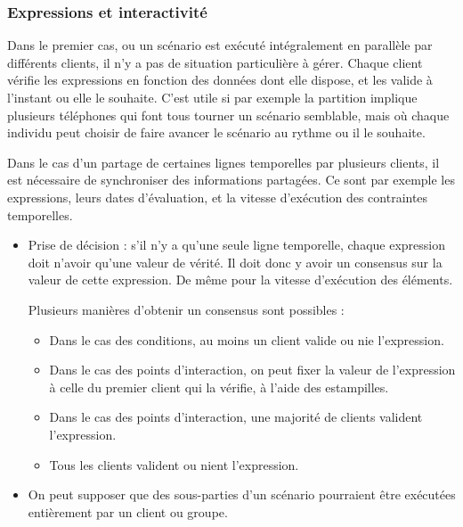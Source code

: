 \documentclass{article}
\begin{document}
\begin{figure}[h]
	\centering
	\begin{tikzpicture}
	
	\end{tikzpicture}
	\label{scenar.non-interactif}
\end{figure}


\subsubsection{Expressions et interactivité}
Dans le premier cas, ou un scénario est exécuté intégralement en parallèle par différents clients, il n'y a pas de situation particulière à gérer.
Chaque client vérifie les expressions en fonction des données dont elle dispose, et les valide à l'instant ou elle le souhaite. 
C'est utile si par exemple la partition implique plusieurs téléphones qui font tous tourner un scénario semblable, mais où chaque individu peut choisir de faire avancer le scénario au rythme ou il le souhaite.

Dans le cas d'un partage de certaines lignes temporelles par plusieurs clients, il est nécessaire de synchroniser des informations partagées.
Ce sont par exemple les expressions, leurs dates d'évaluation, et la vitesse d'exécution des contraintes temporelles.

\begin{itemize}
	\item Prise de décision : s'il n'y a qu'une seule ligne temporelle, chaque expression doit n'avoir qu'une valeur de vérité. Il doit donc y avoir un consensus sur la valeur de cette expression. De même pour la vitesse d'exécution des éléments.
    
    Plusieurs manières d'obtenir un consensus sont possibles : 
    \begin{itemize}
        \item Dans le cas des conditions, au moins un client valide ou nie l'expression. 
        \item Dans le cas des points d'interaction, on peut fixer la valeur de l'expression à celle du premier client qui la vérifie, à l'aide des estampilles. %
        \item Dans le cas des points d'interaction, une majorité de clients valident l'expression.
        \item Tous les clients valident ou nient l'expression.
    \end{itemize}

	\item On peut supposer que des sous-parties d'un scénario pourraient être exécutées entièrement par un client ou groupe.
\end{itemize}
\end{document}
